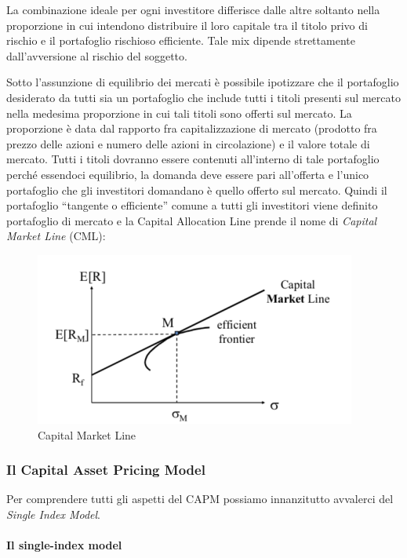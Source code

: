 La combinazione ideale per ogni investitore differisce dalle altre soltanto nella proporzione in cui intendono distribuire il loro capitale tra il titolo privo di rischio e il portafoglio rischioso efficiente. Tale mix dipende strettamente dall'avversione al rischio del soggetto. 

Sotto l'assunzione di equilibrio dei mercati è possibile ipotizzare che il portafoglio desiderato da tutti sia un portafoglio che include tutti i titoli presenti sul mercato nella medesima proporzione in cui tali titoli sono offerti sul mercato. La proporzione è data dal rapporto fra capitalizzazione di mercato (prodotto fra prezzo delle azioni e numero delle azioni in circolazione) e il valore totale di mercato. Tutti i titoli dovranno essere contenuti all'interno di tale portafoglio perché essendoci equilibrio, la domanda deve essere pari all'offerta e l'unico portafoglio che gli investitori domandano è quello offerto sul mercato. Quindi il portafoglio “tangente o efficiente” comune a tutti gli investitori viene definito portafoglio di mercato e la Capital Allocation Line prende il nome di \textit{Capital Market Line} (CML):

\begin{figure}[h!]
	\centering
\includegraphics[width=0.7\linewidth]{"imgs/CML"}
\caption{Capital Market Line \cite{noauthor_kapitalmarktlinie_2019}}
\label{fig:cml}
\end{figure}

\subsubsection{Il Capital Asset Pricing Model}

Per comprendere tutti gli aspetti del CAPM possiamo innanzitutto avvalerci del \textit{Single Index Model}.

\paragraph{Il single-index model}

